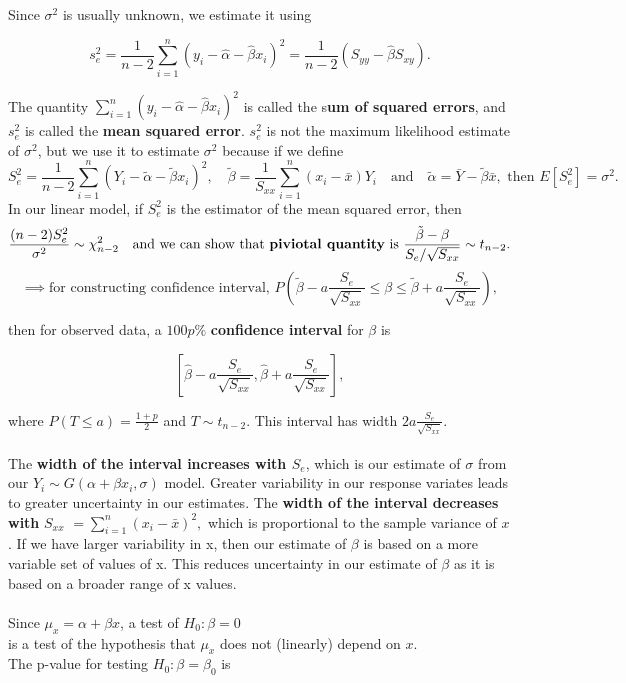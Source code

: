 \documentclass[a4paper,12pt]{article}
\begin{document}
Since \(\sigma^2\) is usually unknown, we estimate it using

\[
s_e^2 = \frac{1}{n - 2} \sum_{i=1}^n (y_i - \hat{\alpha} - \hat{\beta}x_i)^2 = \frac{1}{n - 2} (S_{yy} - \hat{\beta} S_{xy}).
\]

The quantity \(\sum_{i=1}^n (y_i - \hat{\alpha} - \hat{\beta}x_i)^2\) is called the s\textbf{um of squared errors}, and \(s_e^2\) is called the \textbf{mean squared error}.
\(s_e^2\) is not the maximum likelihood estimate of \(\sigma^2\), but we use it to estimate \(\sigma^2\) because if we define
\[
S_e^2 = \frac{1}{n - 2} \sum_{i=1}^n (Y_i - \tilde{\alpha} - \tilde{\beta}x_i)^2, \quad
\tilde{\beta} = \frac{1}{S_{xx}} \sum_{i=1}^n (x_i - \bar{x})Y_i \quad \text{and} \quad \tilde{\alpha} = \bar{Y} - \tilde{\beta}\bar{x}, 
\text{ then } E[S_e^2] = \sigma^2.\]
In our linear model, if $ S_e^2$ is the estimator of the mean squared error, then
\[
\frac{(n - 2)S_e^2}{\sigma^2} \sim \chi^2_{n-2}
\text{\quad and we can show that \textbf{piviotal quantity} is }
\frac{\tilde{\beta} - \beta}{S_e / \sqrt{S_{xx}}} \sim t_{n-2}.
\]
\[\implies \text{for constructing confidence interval, }
P\left( \tilde{\beta} - a \frac{S_e}{\sqrt{S_{xx}}} \leq \beta \leq \tilde{\beta} + a \frac{S_e}{\sqrt{S_{xx}}} \right),
\]

then for observed data, a \(100p\%\) \textbf{confidence interval} for \(\beta\) is

\[
\left[ \hat{\beta} - a \frac{S_e}{\sqrt{S_{xx}}}, \hat{\beta} + a \frac{S_e}{\sqrt{S_{xx}}} \right],
\]

where \(P(T \leq a) = \frac{1 + p}{2}\) and \(T \sim t_{n-2}\).  This interval has width
$2a \frac{S_e}{\sqrt{S_{xx}}}.$
\\
\\The \textbf{width of the interval increases with \(S_e\)}, which is our estimate of \(\sigma\) from our \(Y_i \sim G(\alpha + \beta x_i, \sigma)\) model. Greater variability in our response variates leads to greater
uncertainty in our estimates. 
\newpage
The \textbf{width of the interval decreases with} \(S_{xx}\) $= \sum_{i=1}^n (x_i - \bar{x})^2,$
which is proportional to the sample variance of \(x\). If we have larger variability in x, then our estimate of $\beta$ is based on
a more variable set of values of x. This reduces uncertainty in our
estimate of $\beta$ as it is based on a broader range of x values.
\\
\\Since \(\mu_x = \alpha + \beta x\), a test of
$H_0 : \beta = 0$ 
\\is a test of the hypothesis that \(\mu_x\) does not (linearly) depend on \(x\).
\\The p-value for testing \( H_0 : \beta = \beta_0 \) is
\end{document}
